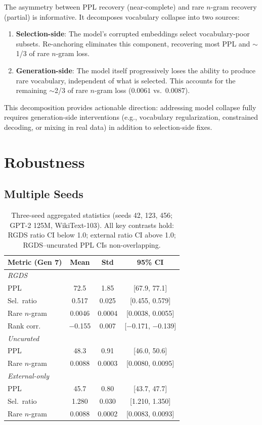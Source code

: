 \documentclass[11pt,a4paper]{article}
\begin{document}
The asymmetry between PPL recovery (near-complete) and rare $n$-gram recovery (partial) is informative.
It decomposes vocabulary collapse into two sources:
\begin{enumerate}
\item \textbf{Selection-side}: The model's corrupted embeddings select vocabulary-poor subsets. Re-anchoring eliminates this component, recovering most PPL and $\sim$1/3 of rare $n$-gram loss.
\item \textbf{Generation-side}: The model itself progressively loses the ability to produce rare vocabulary, independent of what is selected. This accounts for the remaining $\sim$2/3 of rare $n$-gram loss ($0.0061$ vs.\ $0.0087$).
\end{enumerate}

This decomposition provides actionable direction: addressing model collapse fully requires generation-side interventions (e.g., vocabulary regularization, constrained decoding, or mixing in real data) in addition to selection-side fixes.

\section{Robustness}
\label{sec:robustness}

\subsection{Multiple Seeds}

\begin{table}[t]
\centering
\small
\begin{tabular}{lccc}
\toprule
\textbf{Metric (Gen 7)} & \textbf{Mean} & \textbf{Std} & \textbf{95\% CI} \\
\midrule
\multicolumn{4}{l}{\textit{RGDS}} \\
PPL & 72.5 & 1.85 & [67.9, 77.1] \\
Sel.\ ratio & 0.517 & 0.025 & [0.455, 0.579] \\
Rare $n$-gram & 0.0046 & 0.0004 & [0.0038, 0.0055] \\
Rank corr. & $-$0.155 & 0.007 & [$-$0.171, $-$0.139] \\
\midrule
\multicolumn{4}{l}{\textit{Uncurated}} \\
PPL & 48.3 & 0.91 & [46.0, 50.6] \\
Rare $n$-gram & 0.0088 & 0.0003 & [0.0080, 0.0095] \\
\midrule
\multicolumn{4}{l}{\textit{External-only}} \\
PPL & 45.7 & 0.80 & [43.7, 47.7] \\
Sel.\ ratio & 1.280 & 0.030 & [1.210, 1.350] \\
Rare $n$-gram & 0.0088 & 0.0002 & [0.0083, 0.0093] \\
\bottomrule
\end{tabular}
\caption{Three-seed aggregated statistics (seeds 42, 123, 456; GPT-2 125M, WikiText-103). All key contrasts hold: RGDS ratio CI below 1.0; external ratio CI above 1.0; RGDS--uncurated PPL CIs non-overlapping.}
\label{tab:three_seed}
\end{table}
\end{document}
